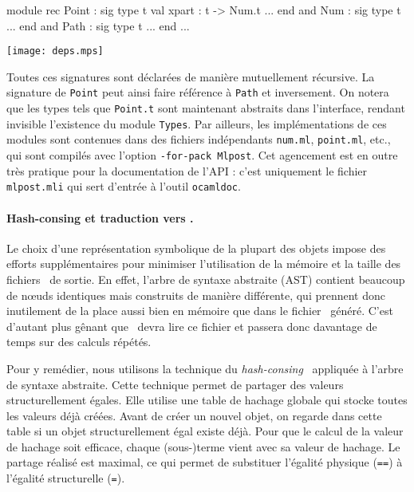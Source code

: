 \documentclass[twoside]{studia-Hermann}
\newcommand{\metapost}{\MP}
\begin{document}
\medskip
\begin{minipage}{0.3\textwidth}
\small\begin{ocaml}
module rec Point : sig
  type t
  val xpart : t -> Num.t
  ...
end
and Num : sig
  type t
  ...
end
and Path : sig
  type t
  ...
end
...
\end{ocaml}
\end{minipage}
\begin{minipage}{0.6\textwidth}
  \texttt{[image: deps.mps]}
\end{minipage}

Toutes ces signatures sont déclarées de manière mutuellement
récursive. La signature de \texttt{Point} peut ainsi faire référence à
\texttt{Path} et inversement.  On notera que les types tels que
\texttt{Point.t} sont maintenant abstraits dans l'interface, rendant
invisible l'existence du module \texttt{Types}.  Par ailleurs, les
implémentations de ces modules sont contenues dans des fichiers
indépendants \texttt{num.ml}, \texttt{point.ml}, etc., qui sont
compilés avec l'option {\tt -for-pack Mlpost}.  Cet agencement est en
outre très pratique pour la documentation de l'API : c'est uniquement
le fichier \texttt{mlpost.mli} qui sert d'entrée à l'outil
\texttt{ocamldoc}.

\paragraph{Hash-consing et traduction vers \metapost.}

Le choix d'une représentation symbolique de la plupart des objets impose
des efforts supplémentaires pour minimiser l'utilisation de la mémoire
et la taille des fichiers \metapost\ de sortie. En effet, l'arbre de
syntaxe abstraite (AST) contient beaucoup de n\oe uds identiques mais
construits de manière différente, qui prennent donc inutilement de la
place aussi bien en mémoire que dans le fichier \metapost\ généré. C'est
d'autant plus gênant que \metapost\ devra lire ce fichier et passera
donc davantage de temps sur des calculs répétés.

Pour y remédier, nous utilisons la technique du {\em
hash-consing}~\cite{ConchonFilliatre06wml} appliquée à l'arbre de syntaxe
abstraite. Cette technique permet de partager des valeurs structurellement
égales. Elle utilise une table de hachage globale qui stocke toutes les valeurs
déjà créées. Avant de créer un nouvel objet, on regarde dans cette table si un
objet structurellement égal existe déjà. Pour que le calcul de la valeur de
hachage soit efficace, chaque (sous-)terme
vient avec sa valeur de hachage. Le partage réalisé est maximal, ce
qui permet de substituer l'égalité physique (\texttt{==}) à l'égalité
structurelle (\texttt{=}). 
\end{document}
